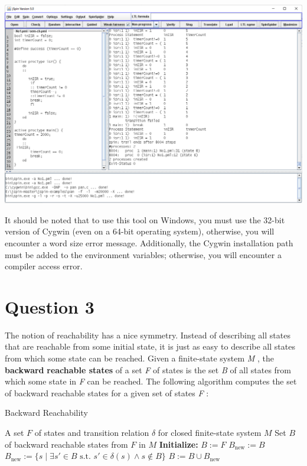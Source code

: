 \documentclass[12pt]{article}
\begin{document}
\begin{qsolve}
	\begin{center}
		\includegraphics*[width=0.9\linewidth]{images/img4}
	\end{center}
	
	It should be noted that to use this tool on Windows, you must use the 32-bit version of Cygwin (even on a 64-bit operating system), otherwise, you will encounter a word size error message. Additionally, the Cygwin installation path must be added to the environment variables; otherwise, you will encounter a compiler access error.
\end{qsolve}


\vfil
\clearpage






\section{Question 3}
The notion of reachability has a nice symmetry. Instead of describing all states that
are reachable from some initial state, it is just as easy to describe all states from
which some state can be reached. Given a finite-state system \textit{M} , the \textbf{backward}
\textbf{reachable states} of a set \textit{F} of states is the set \textit{B} of all states from which some state in \textit{F} can be reached. The following algorithm computes the set of backward reachable states for a given set of states \textit{F} :

\begin{algorithm}
	\caption{Backward Reachability}
	\begin{algorithmic}[1]
		\Require A set \( F \) of states and transition relation \( \delta \) for closed finite-state system \( M \)
		\Ensure Set \( B \) of backward reachable states from \( F \) in \( M \)
		\State \textbf{Initialize:} \( B := F \)
		\State \( B_{\text{new}} := B \)
		\State \( B_{\text{new}} := \{ s \mid \exists s' \in B \text{ s.t. } s' \in \delta(s) \land s \notin B \} \)
		\State \( B := B \cup B_{\text{new}} \)
		\EndWhile
	\end{algorithmic}
\end{algorithm}
\end{document}

